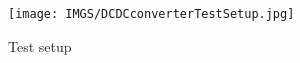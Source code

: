 
\begin{figure}[H]
	\centering
	\texttt{[image: IMGS/DCDCconverterTestSetup.jpg]}
	\caption{Test setup}
	\label{fig:arch}
\end{figure} 

